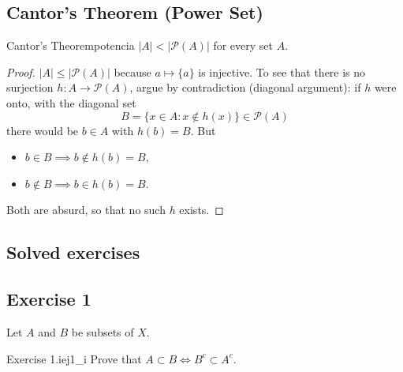 \documentclass[11pt, a4paper]{article}
\begin{document}
\subsection{Cantor's Theorem (Power Set)}

\begin{teorema}{Cantor's Theorem}{potencia}
$|A| < |\mathcal{P}(A)|$ for every set $A$.
\end{teorema}

\begin{proof}
$|A| \le |\mathcal{P}(A)|$ because $a \mapsto \{a\}$ is injective. To see that there is no surjection
$h: A \to \mathcal{P}(A)$, argue by contradiction (diagonal argument): if $h$ were onto, with the
diagonal set
$$ B = \{ x \in A : x \notin h(x) \} \in \mathcal{P}(A) $$
there would be $b \in A$ with $h(b) = B$. But
\begin{itemize}
    \item $b \in B \implies b \notin h(b) = B$,
    \item $b \notin B \implies b \in h(b) = B$.
\end{itemize}
Both are absurd, so that no such $h$ exists.
\end{proof}

\newpage

\subsection{Solved exercises}

\subsection*{Exercise 1}

Let $A$ and $B$ be subsets of $X$.

\begin{proposicion}{Exercise 1.i}{ej1_i}
Prove that $A \subset B \iff B^c \subset A^c$.
\end{proposicion}
\end{document}
